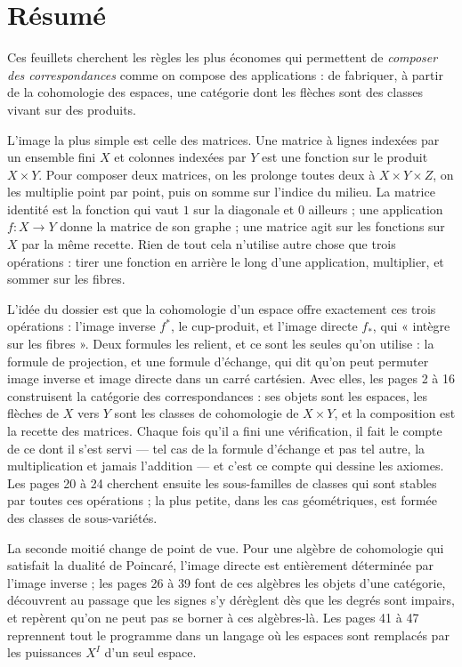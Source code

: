 \documentclass[11pt,a4paper]{article}
\begin{document}
\section*{Résumé}

\begin{resume}
Ces feuillets cherchent les règles les plus économes qui permettent de
\emph{composer des correspondances} comme on compose des applications : de
fabriquer, à partir de la cohomologie des espaces, une catégorie dont les
flèches sont des classes vivant sur des produits.

L'image la plus simple est celle des matrices. Une matrice à lignes indexées
par un ensemble fini $X$ et colonnes indexées par $Y$ est une fonction sur le
produit $X \times Y$. Pour composer deux matrices, on les prolonge toutes deux
à $X \times Y \times Z$, on les multiplie point par point, puis on somme sur
l'indice du milieu. La matrice identité est la fonction qui vaut $1$ sur la
diagonale et $0$ ailleurs ; une application $f \colon X \to Y$ donne la matrice
de son graphe ; une matrice agit sur les fonctions sur $X$ par la même
recette. Rien de tout cela n'utilise autre chose que trois opérations : tirer
une fonction en arrière le long d'une application, multiplier, et sommer sur
les fibres.

L'idée du dossier est que la cohomologie d'un espace offre exactement ces
trois opérations : l'image inverse $f^{*}$, le cup-produit, et l'image directe
$f_{*}$, qui « intègre sur les fibres ». Deux formules les relient, et ce sont
les seules qu'on utilise : la formule de projection, et une formule
d'échange, qui dit qu'on peut permuter image inverse et image directe dans un
carré cartésien. Avec elles, les pages 2 à 16 construisent la catégorie des
correspondances : ses objets sont les espaces, les flèches de $X$ vers $Y$ sont
les classes de cohomologie de $X \times Y$, et la composition est la recette
des matrices. Chaque fois qu'il a fini une vérification, il fait le compte de
ce dont il s'est servi --- tel cas de la formule d'échange et pas tel autre, la
multiplication et jamais l'addition --- et c'est ce compte qui dessine les
axiomes. Les pages 20 à 24 cherchent ensuite les sous-familles de classes qui
sont stables par toutes ces opérations ; la plus petite, dans les cas
géométriques, est formée des classes de sous-variétés.

La seconde moitié change de point de vue. Pour une algèbre de cohomologie qui
satisfait la dualité de Poincaré, l'image directe est entièrement déterminée
par l'image inverse ; les pages 26 à 39 font de ces algèbres les objets d'une
catégorie, découvrent au passage que les signes s'y dérèglent dès que les
degrés sont impairs, et repèrent qu'on ne peut pas se borner à ces algèbres-là.
Les pages 41 à 47 reprennent tout le programme dans un langage où les espaces
sont remplacés par les puissances $X^{I}$ d'un seul espace.


\end{resume}
\end{document}
